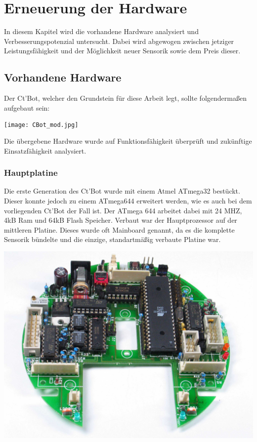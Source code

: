 \documentclass[a4paper,cleardoubleempty,BCOR1cm]{book}
\begin{document}
\section{Erneuerung der Hardware}
In diesem Kapitel wird die vorhandene Hardware analysiert und Verbesserungspotenzial untersucht. Dabei wird abgewogen zwischen jetziger Leistungsfähigkeit und der Möglichkeit neuer Sensorik sowie dem Preis dieser. 

\subsection{Vorhandene Hardware}
Der Ct'Bot, welcher den Grundstein für diese Arbeit legt, sollte folgendermaßen aufgebaut sein:

\texttt{[image: CBot\_mod.jpg]}

Die übergebene Hardware wurde auf Funktionsfähigkeit überprüft und zukünftige Einsatzfähigkeit analysiert. 

\subsubsection{Hauptplatine}
Die erste Generation des Ct'Bot wurde mit einem Atmel ATmega32 bestückt. Dieser konnte jedoch zu einem ATmega644 erweitert werden, wie es auch bei dem vorliegenden Ct'Bot der Fall ist. Der ATmega 644 arbeitet dabei mit 24 MHZ, 4kB Ram und 64kB Flash Speicher. Verbaut war der Hauptprozessor auf der mittleren Platine. Dieses wurde oft Mainboard genannt, da es die komplette Sensorik bündelte und die einzige, standartmäßig verbaute Platine war. 

\includegraphics[scale=0.1]{images/mainboard.jpg}
\end{document}
